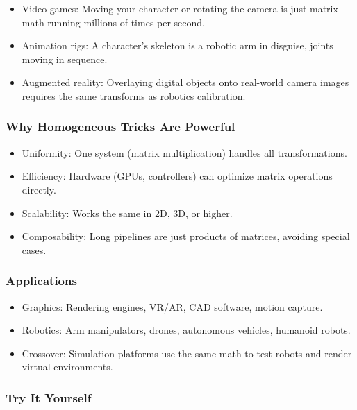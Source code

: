 \documentclass[
  letterpaper,
  DIV=11,
  numbers=noendperiod]{scrreprt}
\providecommand{\tightlist}{%
  \setlength{\itemsep}{0pt}\setlength{\parskip}{0pt}}
\begin{document}
\begin{itemize}
\tightlist
\item
  Video games: Moving your character or rotating the camera is just
  matrix math running millions of times per second.
\item
  Animation rigs: A character's skeleton is a robotic arm in disguise,
  joints moving in sequence.
\item
  Augmented reality: Overlaying digital objects onto real-world camera
  images requires the same transforms as robotics calibration.
\end{itemize}

\subsubsection{Why Homogeneous Tricks Are
Powerful}\label{why-homogeneous-tricks-are-powerful}

\begin{itemize}
\tightlist
\item
  Uniformity: One system (matrix multiplication) handles all
  transformations.
\item
  Efficiency: Hardware (GPUs, controllers) can optimize matrix
  operations directly.
\item
  Scalability: Works the same in 2D, 3D, or higher.
\item
  Composability: Long pipelines are just products of matrices, avoiding
  special cases.
\end{itemize}

\subsubsection{Applications}\label{applications-49}

\begin{itemize}
\tightlist
\item
  Graphics: Rendering engines, VR/AR, CAD software, motion capture.
\item
  Robotics: Arm manipulators, drones, autonomous vehicles, humanoid
  robots.
\item
  Crossover: Simulation platforms use the same math to test robots and
  render virtual environments.
\end{itemize}

\subsubsection{Try It Yourself}\label{try-it-yourself-91}
\end{document}
